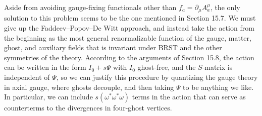 Aside from avoiding gauge-fixing functionals other than $f_a=\partial_\mu A_a^\mu$, the only solution to this problem seems to be the one mentioned in Section 15.7. We must give up the Faddeev--Popov--De Witt approach, and instead take the action from the beginning as the most general renormalizable function of the gauge, matter, ghost, and auxiliary fields that is invariant under BRST and the other symmetries of the theory. According to the arguments of Section 15.8, the action can be written in the form $I_0+s\Psi$ with $I_0$ ghost-free, and the $S$-matrix is independent of $\Psi$, so we can justify this procedure by quantizing the gauge theory in axial gauge, where ghosts decouple, and then taking $\Psi$ to be anything we like. In particular, we can include $s(\omega^*\omega^*\omega)$ terms in the action that can serve as counterterms to the divergences in four-ghost vertices.
